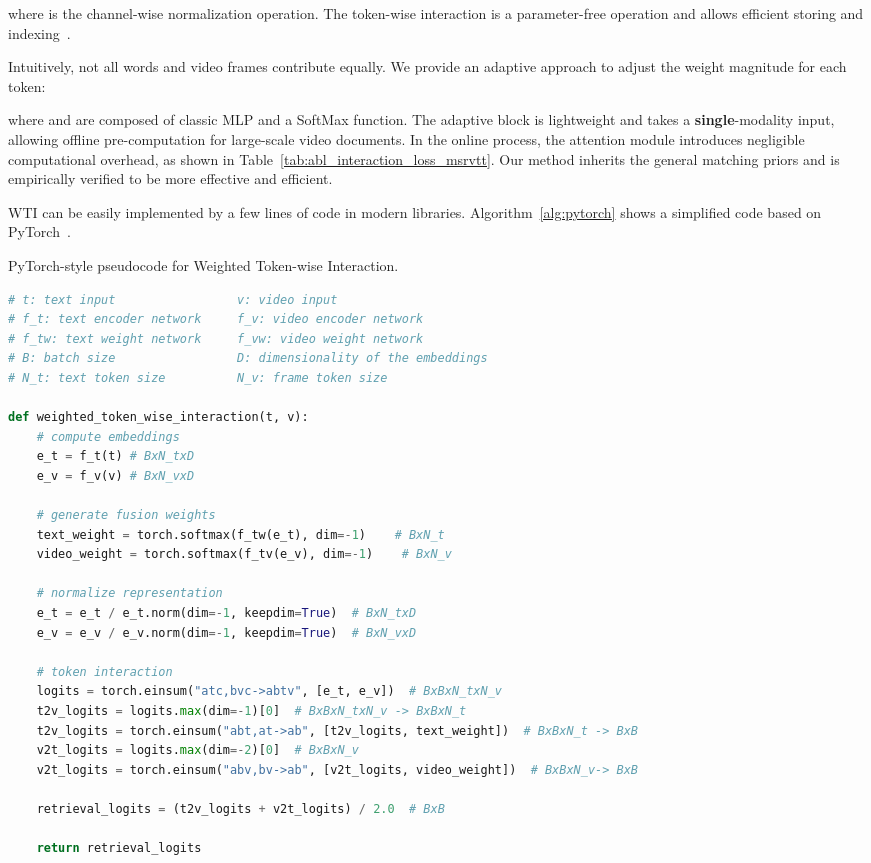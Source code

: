 \documentclass[runningheads]{llncs}
\begin{document}
where  is the channel-wise normalization operation. The token-wise interaction is a parameter-free operation and allows efficient storing and indexing~\cite{colbert}.

Intuitively, not all words and video frames contribute equally. 
We provide an adaptive approach to adjust the weight magnitude for each token:

where  and  are composed of classic MLP and a SoftMax function.
The adaptive block is lightweight and takes a \textbf{single}-modality input, allowing offline pre-computation for large-scale video documents. 
In the online process, the attention module introduces negligible computational overhead, as shown in Table~\ref{tab:abl_interaction_loss_msrvtt}.
Our method inherits the general matching priors and is empirically verified to be more effective and efficient.

WTI can be easily implemented by a few lines of code in modern libraries.
Algorithm~\ref{alg:pytorch} shows a simplified code based on PyTorch~\cite{pytorch}.

\begin{algorithm}[tb]
   \caption{PyTorch-style pseudocode for Weighted Token-wise Interaction.}
   \label{alg:pytorch}
   
\begin{lstlisting}[language=python]
# t: text input                 v: video input
# f_t: text encoder network     f_v: video encoder network
# f_tw: text weight network     f_vw: video weight network
# B: batch size                 D: dimensionality of the embeddings
# N_t: text token size          N_v: frame token size

def weighted_token_wise_interaction(t, v):    
    # compute embeddings
    e_t = f_t(t) # BxN_txD
    e_v = f_v(v) # BxN_vxD
    
    # generate fusion weights
    text_weight = torch.softmax(f_tw(e_t), dim=-1)    # BxN_t
    video_weight = torch.softmax(f_tv(e_v), dim=-1)    # BxN_v
    
    # normalize representation
    e_t = e_t / e_t.norm(dim=-1, keepdim=True)  # BxN_txD
    e_v = e_v / e_v.norm(dim=-1, keepdim=True)  # BxN_vxD
    
    # token interaction
    logits = torch.einsum("atc,bvc->abtv", [e_t, e_v])  # BxBxN_txN_v
    t2v_logits = logits.max(dim=-1)[0]  # BxBxN_txN_v -> BxBxN_t
    t2v_logits = torch.einsum("abt,at->ab", [t2v_logits, text_weight])  # BxBxN_t -> BxB
    v2t_logits = logits.max(dim=-2)[0]  # BxBxN_v
    v2t_logits = torch.einsum("abv,bv->ab", [v2t_logits, video_weight])  # BxBxN_v-> BxB
    
    retrieval_logits = (t2v_logits + v2t_logits) / 2.0  # BxB
    
    return retrieval_logits
\end{lstlisting}
\end{algorithm}
\end{document}

